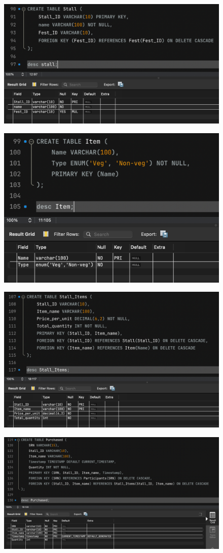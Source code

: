 \documentclass{article}
\begin{document}
\begin{figure}[H]
    \centering
    \includegraphics[width=0.7\linewidth]{images/task 1/10.png}
\end{figure}

\begin{figure}[H]
    \centering
    \includegraphics[width=0.7\linewidth]{images/task 1/11.png}
\end{figure}

\begin{figure}[H]
    \centering
    \includegraphics[width=0.7\linewidth]{images/task 1/12.png}
\end{figure}

\begin{figure}[H]
    \centering
    \includegraphics[width=0.7\linewidth]{images/task 1/13.png}
\end{figure}
\end{document}
